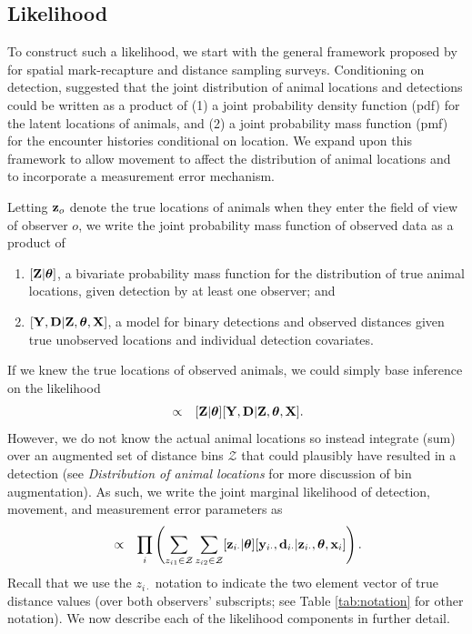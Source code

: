 \documentclass[aoas,preprint]{imsart}
\numberwithin{equation}{section}
\theoremstyle{plain}
\begin{document}
\subsection{Likelihood}

To construct such a likelihood, we start with the general framework proposed by \citet{BorchersEtAl2015} for spatial mark-recapture and distance sampling surveys.  Conditioning on detection, \citet{BorchersEtAl2015} suggested that the joint distribution of animal locations and detections could be written as a product of (1) a joint probability density function (pdf) for the latent locations of animals, and (2) a joint probability mass function (pmf) for the encounter histories conditional on location.  We expand upon this framework to allow movement to affect the distribution of animal locations and to incorporate a measurement error mechanism.

Letting ${\bf z}_o$ denote the true locations of animals when they enter the field of view of observer $o$, we write the joint probability mass function of observed data as a product of
\begin{enumerate}
   \item $[{\bf Z}|\boldsymbol{\theta}]$, a bivariate probability mass function for the distribution of true animal locations, given detection by at least one observer; and
   \item $[{\bf Y},{\bf D}|{\bf Z},\boldsymbol{\theta},{\bf X}]$, a model for binary detections and observed distances given true unobserved locations and individual detection covariates.
\end{enumerate}
If we knew the true locations of observed animals, we could simply base inference on the likelihood
\begin{eqnarray*}
  [\boldsymbol{\theta} | {\bf Y},{\bf D}, {\bf X}] & \propto & [{\bf Z}|\boldsymbol{\theta}][{\bf Y},{\bf D}|{\bf Z},\boldsymbol{\theta},{\bf X}].
\end{eqnarray*}
However, we do not know the actual animal locations so instead integrate (sum) over an augmented set of distance bins $\mathcal{Z}$ that could plausibly have resulted in a detection (see \textit{Distribution of animal locations} for more discussion of bin augmentation).
As such, we write the joint marginal likelihood of detection, movement, and measurement error parameters as
\begin{eqnarray}
  [\boldsymbol{\theta} | {\bf Y},{\bf D}, {\bf X}] & \propto & \prod_i \left( \sum_{z_{i1} \in \mathcal{Z}} \sum_{z_{i2} \in \mathcal{Z}} [{\bf z}_{i \cdot} |\boldsymbol{\theta}][{\bf y}_{i \cdot},{\bf d}_{i \cdot}|{\bf z}_{i \cdot} , \boldsymbol{\theta} , {\bf x}_i]
   \right).
  \label{eq:lik}
\end{eqnarray}
Recall that we use the $z_{i \cdot}$ notation to indicate the two element vector of true distance values (over both observers' subscripts; see Table \ref{tab:notation} for other notation). We now describe each of the likelihood components in further detail.
\end{document}
